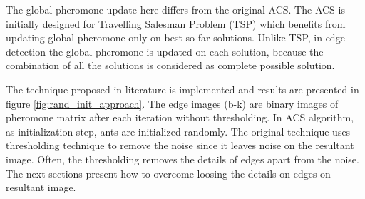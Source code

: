 \documentclass{llncs}
\begin{document}
	The global pheromone update here differs from the original ACS. The ACS is initially designed for Travelling Salesman Problem (TSP) which benefits from updating global pheromone only on best so far solutions. Unlike TSP, in edge detection the global pheromone is updated on each solution, because the combination of all the solutions is considered as complete possible solution.
	
	The technique proposed in literature \cite{Anna:2010} is implemented and results are presented in figure \ref{fig:rand_init_approach}. The edge images (b-k) are binary images of pheromone matrix after each iteration without thresholding. In ACS algorithm, as initialization step, ants are initialized randomly.  The original technique uses thresholding technique to remove the noise since it leaves noise on the resultant image. Often, the thresholding removes the details of edges apart from the noise. The next sections present how to overcome loosing the details on edges on resultant image.
	
\end{document}
